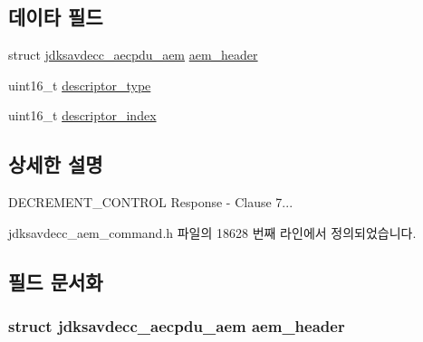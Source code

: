 \subsection*{데이타 필드}
\begin{DoxyCompactItemize}
\item 
struct \hyperlink{structjdksavdecc__aecpdu__aem}{jdksavdecc\+\_\+aecpdu\+\_\+aem} \hyperlink{structjdksavdecc__aem__command__decrement__control__response_ae1e77ccb75ff5021ad923221eab38294}{aem\+\_\+header}
\item 
uint16\+\_\+t \hyperlink{structjdksavdecc__aem__command__decrement__control__response_ab7c32b6c7131c13d4ea3b7ee2f09b78d}{descriptor\+\_\+type}
\item 
uint16\+\_\+t \hyperlink{structjdksavdecc__aem__command__decrement__control__response_a042bbc76d835b82d27c1932431ee38d4}{descriptor\+\_\+index}
\end{DoxyCompactItemize}


\subsection{상세한 설명}
D\+E\+C\+R\+E\+M\+E\+N\+T\+\_\+\+C\+O\+N\+T\+R\+OL Response -\/ Clause 7... 

jdksavdecc\+\_\+aem\+\_\+command.\+h 파일의 18628 번째 라인에서 정의되었습니다.



\subsection{필드 문서화}
\subsubsection[{\texorpdfstring{aem\+\_\+header}{aem_header}}]{\setlength{\rightskip}{0pt plus 5cm}struct {\bf jdksavdecc\+\_\+aecpdu\+\_\+aem} aem\+\_\+header}\hypertarget{structjdksavdecc__aem__command__decrement__control__response_ae1e77ccb75ff5021ad923221eab38294}{}\label{structjdksavdecc__aem__command__decrement__control__response_ae1e77ccb75ff5021ad923221eab38294}


